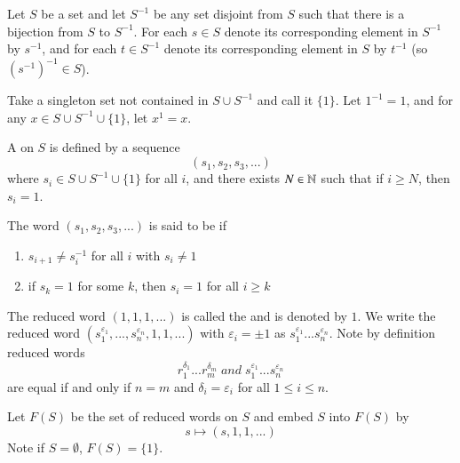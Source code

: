 \documentclass[12pt, a4paper, twoside, openright, titlepage]{book}
\begin{document}
\begin{cons}{}{}
        Let $S$ be a set and let $S^{-1}$ be any set disjoint from $S$ such that there is a bijection from $S$ to $S^{-1}$. For each $s \in S$ denote its corresponding element in $S^{-1}$ by $s^{-1}$, and for each $t \in S^{-1}$ denote its corresponding element in $S$ by $t^{-1}$ (so $(s^{-1})^{-1} \in S$). 

        Take a singleton set not contained in $S \cup S^{-1}$ and call it $\{1\}$. Let $1^{-1} = 1$, and for any $x \in S\cup S^{-1}\cup\{1\}$, let $x^1 = x$.

        A  on $S$ is defined by a sequence \begin{equation}
                (s_1,s_2,s_3,...)
        \end{equation}
        where $s_i \in S\cup S^{-1} \cup \{1\}$ for all $i$, and there exists $N \in \mathbb N$ such that if $i \geq N$, then $s_i = 1$.

        The word $(s_1,s_2,s_3,...)$ is said to be  if \begin{enumerate}
                \item $s_{i+1} \neq s_i^{-1}$ for all $i$ with $s_i \neq 1$
                \item if $s_k = 1$ for some $k$, then $s_i = 1$ for all $i \geq k$
        \end{enumerate}
        The reduced word $(1,1,1,...)$ is called the  and is denoted by $1$. We write the reduced word $(s_1^{\varepsilon_1},...,s_n^{\varepsilon_n},1,1,...)$ with $\varepsilon_i = \pm 1$ as $s_1^{\varepsilon_1}...s_n^{\varepsilon_n}$. Note by definition reduced words \begin{equation}
                r_1^{\delta_1}...r_m^{\delta_m}\;and\;s_1^{\varepsilon_1}...s_n^{\varepsilon_n}
        \end{equation}
        are equal if and only if $n = m$ and $\delta_i = \varepsilon_i$ for all $1\leq i \leq n$.

        Let $F(S)$ be the set of reduced words on $S$ and embed $S$ into $F(S)$ by \begin{equation}
                s \mapsto (s,1,1,...)
        \end{equation}
        Note if $S = \emptyset$, $F(S) = \{1\}$.
        

\end{cons}
\end{document}
